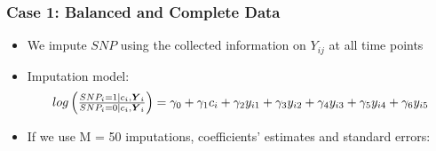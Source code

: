 \documentclass[pdf]{beamer}
\begin{document}
\begin{frame}
\frametitle{Case 1: Balanced and Complete Data}
\begin{itemize}
	\setlength\itemsep{0.8em}
	\item We impute $SNP$ using the collected information on $Y_{ij}$ at all time points
	\item Imputation model:
	\begin{equation}\nonumber
	\resizebox{.9 \textwidth}{!} 
	{
	$log\left(\frac{SNP_i = 1 | c_i, \boldsymbol{Y}_i}{SNP_i = 0 | c_i, \boldsymbol{Y}_i}\right) = \gamma_0 + \gamma_1 c_i + \gamma_2 y_{i1} + \gamma_3 y_{i2} + \gamma_4 y_{i3} + \gamma_5 y_{i4} + \gamma_6 y_{i5}$
	}
	\end{equation}
	\item If we use M = 50 imputations, coefficients' estimates and standard errors:
	\end{itemize}
 \begin{table}[H]
 	\centering
\end{table}
\end{frame}
\end{document}
